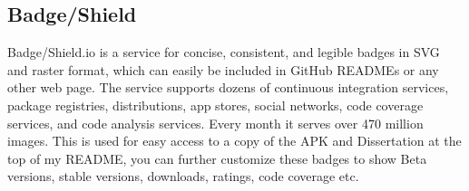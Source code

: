 \subsection{Badge/Shield}
Badge/Shield.io is a service for concise, consistent, and legible badges in SVG and raster format, which can easily be included in GitHub READMEs or any other web page. The service supports dozens of continuous integration services, package registries, distributions, app stores, social networks, code coverage services, and code analysis services. Every month it serves over 470 million images. \cite{badges}
This is used for easy access to a copy of the APK and Dissertation at the top of my README, you can further customize these badges to show Beta versions, stable versions, downloads, ratings, code coverage etc.

